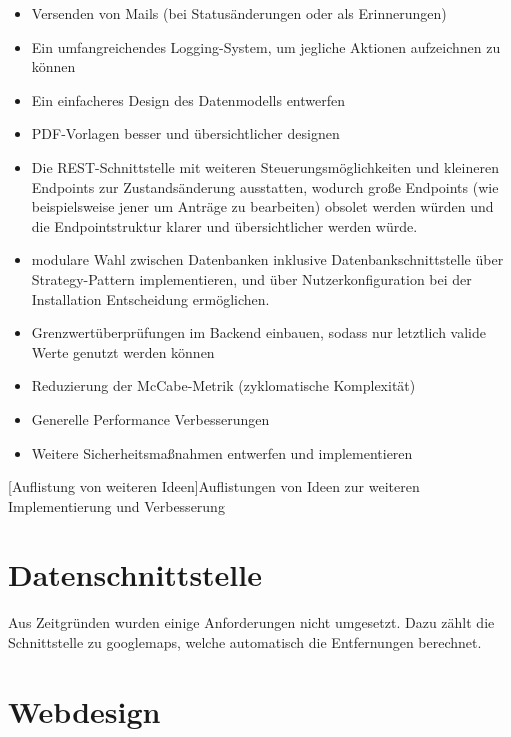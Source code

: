\begin{itemize}
	\item Versenden von Mails (bei Statusänderungen oder als Erinnerungen)
	\item Ein umfangreichendes Logging-System, um jegliche Aktionen aufzeichnen zu können
	\item Ein einfacheres Design des Datenmodells entwerfen
	\item PDF-Vorlagen besser und übersichtlicher designen
	\item Die REST-Schnittstelle mit weiteren Steuerungsmöglichkeiten und kleineren Endpoints zur Zustandsänderung ausstatten, wodurch große Endpoints (wie beispielsweise jener um Anträge zu bearbeiten) obsolet werden würden und die Endpointstruktur klarer und übersichtlicher werden würde.
	\item modulare Wahl zwischen Datenbanken inklusive Datenbankschnittstelle über Strategy-Pattern implementieren, und über Nutzerkonfiguration bei der Installation Entscheidung ermöglichen.
	\item Grenzwertüberprüfungen im Backend einbauen, sodass nur letztlich valide Werte genutzt werden können
	\item Reduzierung der McCabe-Metrik (zyklomatische Komplexität)
	\item Generelle Performance Verbesserungen
	\item Weitere Sicherheitsmaßnahmen entwerfen und implementieren
\end{itemize}
[Auflistung von weiteren Ideen]{Auflistungen von Ideen zur weiteren Implementierung und Verbesserung}

\section{Datenschnittstelle}
Aus Zeitgründen wurden einige Anforderungen nicht umgesetzt. Dazu zählt die Schnittstelle zu \Gls{googlemaps}, welche automatisch die Entfernungen berechnet.

\section{Webdesign}
